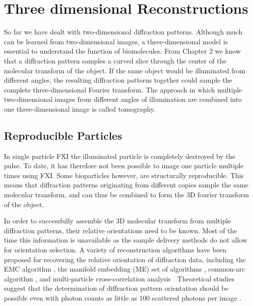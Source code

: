 \chapter{Three dimensional Reconstructions}
So far we have dealt with two-dimensional diffraction patterns. Although much can be learned from two-dimensional images, a three-dimensional model is essential to understand the function of biomolecules.
From Chapter 2 we know that a diffraction pattern samples a curved slice through the center of the molecular transform of the object. If the same object would be illuminated from different angles, the resulting diffraction patterns together could sample the complete three-dimensional Fourier transform. The approach in which multiple two-dimensional images from different angles of illumination are combined into one three-dimensional image is called tomography.%

\section{Reproducible Particles}
In single particle FXI the illuminated particle is completely destroyed by the pulse. To date, it has therefore not been possible to image one particle multiple times using FXI. Some bioparticles however, are structurally reproducible. This means that diffraction patterns originating from different copies sample the same molecular transform, and can thus be combined to form the 3D fourier transform of the object. 

In order to successfully assemble the 3D molecular transform from multiple diffraction patterns, their relative orientations need to be known. Most of the time this information is unavailable as the sample delivery methods do not allow for orientation selection. A variety of reconstruction algorithms have been proposed for recovering the relative orientation of diffraction data, including the EMC algorithm \cite{Loh2009}, the manifold embedding (ME) set of algorithms \cite{Giannakis2010}, common-arc algorithm \cite{Bortel2011}, and multi-particle cross-correlation analysis \cite{Kam1977, Saldin2010, Kirian2011}. Theoretical studies suggest that the determination of diffraction pattern orientation should be possible even with photon counts as little as 100 scattered photons per image \cite{Loh2009}.

